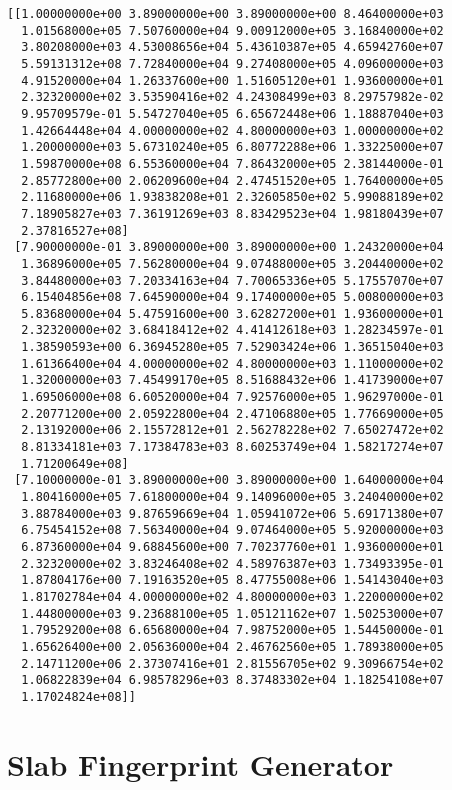 \documentclass[11pt]{article}
\begin{document}
\begin{verbatim}
[[1.00000000e+00 3.89000000e+00 3.89000000e+00 8.46400000e+03
  1.01568000e+05 7.50760000e+04 9.00912000e+05 3.16840000e+02
  3.80208000e+03 4.53008656e+04 5.43610387e+05 4.65942760e+07
  5.59131312e+08 7.72840000e+04 9.27408000e+05 4.09600000e+03
  4.91520000e+04 1.26337600e+00 1.51605120e+01 1.93600000e+01
  2.32320000e+02 3.53590416e+02 4.24308499e+03 8.29757982e-02
  9.95709579e-01 5.54727040e+05 6.65672448e+06 1.18887040e+03
  1.42664448e+04 4.00000000e+02 4.80000000e+03 1.00000000e+02
  1.20000000e+03 5.67310240e+05 6.80772288e+06 1.33225000e+07
  1.59870000e+08 6.55360000e+04 7.86432000e+05 2.38144000e-01
  2.85772800e+00 2.06209600e+04 2.47451520e+05 1.76400000e+05
  2.11680000e+06 1.93838208e+01 2.32605850e+02 5.99088189e+02
  7.18905827e+03 7.36191269e+03 8.83429523e+04 1.98180439e+07
  2.37816527e+08]
 [7.90000000e-01 3.89000000e+00 3.89000000e+00 1.24320000e+04
  1.36896000e+05 7.56280000e+04 9.07488000e+05 3.20440000e+02
  3.84480000e+03 7.20334163e+04 7.70065336e+05 5.17557070e+07
  6.15404856e+08 7.64590000e+04 9.17400000e+05 5.00800000e+03
  5.83680000e+04 5.47591600e+00 3.62827200e+01 1.93600000e+01
  2.32320000e+02 3.68418412e+02 4.41412618e+03 1.28234597e-01
  1.38590593e+00 6.36945280e+05 7.52903424e+06 1.36515040e+03
  1.61366400e+04 4.00000000e+02 4.80000000e+03 1.11000000e+02
  1.32000000e+03 7.45499170e+05 8.51688432e+06 1.41739000e+07
  1.69506000e+08 6.60520000e+04 7.92576000e+05 1.96297000e-01
  2.20771200e+00 2.05922800e+04 2.47106880e+05 1.77669000e+05
  2.13192000e+06 2.15572812e+01 2.56278228e+02 7.65027472e+02
  8.81334181e+03 7.17384783e+03 8.60253749e+04 1.58217274e+07
  1.71200649e+08]
 [7.10000000e-01 3.89000000e+00 3.89000000e+00 1.64000000e+04
  1.80416000e+05 7.61800000e+04 9.14096000e+05 3.24040000e+02
  3.88784000e+03 9.87659669e+04 1.05941072e+06 5.69171380e+07
  6.75454152e+08 7.56340000e+04 9.07464000e+05 5.92000000e+03
  6.87360000e+04 9.68845600e+00 7.70237760e+01 1.93600000e+01
  2.32320000e+02 3.83246408e+02 4.58976387e+03 1.73493395e-01
  1.87804176e+00 7.19163520e+05 8.47755008e+06 1.54143040e+03
  1.81702784e+04 4.00000000e+02 4.80000000e+03 1.22000000e+02
  1.44800000e+03 9.23688100e+05 1.05121162e+07 1.50253000e+07
  1.79529200e+08 6.65680000e+04 7.98752000e+05 1.54450000e-01
  1.65626400e+00 2.05636000e+04 2.46762560e+05 1.78938000e+05
  2.14711200e+06 2.37307416e+01 2.81556705e+02 9.30966754e+02
  1.06822839e+04 6.98578296e+03 8.37483302e+04 1.18254108e+07
  1.17024824e+08]]
\end{verbatim}

\section{Slab Fingerprint Generator}
\label{sec:org8a330bb}
\end{document}
